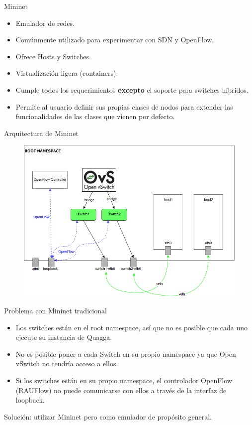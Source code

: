 \documentclass[xcolor=svgnames]{beamer}
\begin{document}
\begin{frame}{Mininet}
	\begin{itemize}
		\item Emulador de redes.
		\item Comúnmente utilizado para experimentar con SDN y OpenFlow.
		\item Ofrece Hosts y Switches.
		\item Virtualización ligera (containers).
		\item Cumple todos los requerimientos \textbf{excepto} el soporte para switches híbridos.
		\item Permite al usuario definir sus propias clases de nodos para extender las funcionalidades de las clases que vienen por defecto.
	\end{itemize}
\end{frame}

\begin{frame}{Arquitectura de Mininet}
	\begin{figure}[t]
		\centering
		\includegraphics[scale=0.5]{mininet_architecture}
	\end{figure}
\end{frame}

\begin{frame}{Problema con Mininet tradicional}
	\begin{itemize}
		\item Los switches están en el root namespace, así que no es posible que cada uno ejecute su instancia de Quagga.
		\item No es posible poner a cada Switch en su propio namespace ya que Open vSwitch no tendría acceso a ellos.
		\item Si los switches están en su propio namespace, el controlador OpenFlow (RAUFlow) no puede comunicarse con ellos a través de la interfaz de loopback.
	\end{itemize}
	\pause
	{\color{teal}Solución: utilizar Mininet pero como emulador de propósito general.}
\end{frame}
\end{document}
